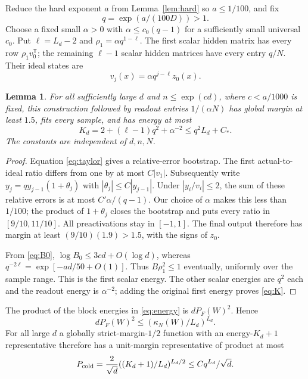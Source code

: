 \documentclass[11pt]{article}
\newtheorem{lemma}[theorem]{Lemma}
\theoremstyle{remark}\newtheorem{remark}[theorem]{Remark}
\begin{document}
Reduce the hard exponent $a$ from Lemma~\ref{lem:hard} so
$a\le1/100$, and fix
\[
 q=\exp(a/(100D))>1.
\]
Choose a fixed small $\alpha>0$
with $\alpha\le c_0(q-1)$ for a sufficiently small universal
$c_0$. Put $\ell=L_d-2$ and
$\rho_1=\alpha q^{1-\ell}$.
The first scalar hidden matrix has every row
$\rho_1v_0^{\mathsf T}$; the remaining $\ell-1$ scalar
hidden matrices have every entry $q/N$.
Their ideal states are
\[
 v_j(x)=\alpha q^{j-\ell}z_0(x).
\]

\begin{lemma}\label{lem:memorizer}
For all sufficiently large $d$ and $n\le\exp(cd)$, where
$c<a/1000$ is fixed, this construction followed by readout
entries $1/(\alpha N)$ has global margin at least $1.5$,
fits every sample, and has energy at most
\begin{equation}\label{eq:K}
 K_d=2+(\ell-1)q^2+\alpha^{-2}\le q^2L_d+C_*.
\end{equation}
The constants are independent of $d,n,N$.
\end{lemma}
\begin{proof}
Equation \eqref{eq:taylor} gives a relative-error bootstrap.
The first actual-to-ideal ratio differs from one by at most
$C|v_1|$. Subsequently write
$y_j=q y_{j-1}(1+\theta_j)$ with
$|\theta_j|\le C|y_{j-1}|$.
Under $|y_i/v_i|\le2$, the sum of these relative errors is at
most $C'\alpha/(q-1)$.
Our choice of $\alpha$ makes this less than $1/100$; the
product of $1+\theta_j$ closes the bootstrap and puts every
ratio in $[9/10,11/10]$.
All preactivations stay in $[-1,1]$.
The final output therefore has margin at least
$(9/10)(1.9)>1.5$, with the signs of $z_0$.

From \eqref{eq:B0}, $\log B_0\le3cd+O(\log d)$, whereas
$q^{-2\ell}=\exp[-ad/50+O(1)]$.
Thus $B\rho_1^2\le1$ eventually, uniformly over the sample
range. This is the first scalar energy.
The other scalar energies are $q^2$ each and the readout
energy is $\alpha^{-2}$; adding the original first energy
proves \eqref{eq:K}.
\end{proof}

The product of the block energies in \eqref{eq:energy} is
$dP_F(W)^2$. Hence
\begin{equation}\label{eq:amgm}
 dP_F(W)^2\le(\kappa_N(W)/L_d)^{L_d}.
\end{equation}
For all large $d$ a globally strict-margin-$1/2$ function with
an energy-$K_d+1$ representative therefore has a unit-margin
representative of product at most
\begin{equation}\label{eq:coldP}
 P_{\rm cold}=\frac2{\sqrt d}
            ((K_d+1)/L_d)^{L_d/2}\le Cq^{L_d}/\sqrt d.
\end{equation}
\end{document}
